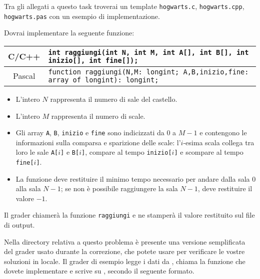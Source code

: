 \begin{warning}
Tra gli allegati a questo task troverai un template \texttt{hogwarts.c}, \texttt{hogwarts.cpp}, \texttt{hogwarts.pas} con un esempio di implementazione.
\end{warning}

Dovrai implementare la seguente funzione:

\begin{center}\begin{tabularx}{\textwidth}{|c|X|}
\hline
C/C++  & \verb|int raggiungi(int N, int M, int A[], int B[], int inizio[], int fine[]);|\\
\hline
Pascal  & \verb|function raggiungi(N,M: longint; A,B,inizio,fine: array of longint): longint;|\\
\hline
\end{tabularx}\end{center}

\begin{itemize}[nolistsep]
  \item L'intero $N$ rappresenta il numero di sale del castello.
  \item L'intero $M$ rappresenta il numero di scale.
  \item Gli array \texttt{A}, \texttt{B}, \texttt{inizio} e \texttt{fine} sono indicizzati da $0$ a $M-1$ e contengono le informazioni sulla comparsa e sparizione delle scale: l'$i$-esima scala collega tra loro le sale \texttt{A[$i$]} e \texttt{B[$i$]}, compare al tempo \texttt{inizio[$i$]} e scompare al tempo \texttt{fine[$i$]}.
  \item La funzione deve restituire il minimo tempo necessario per andare dalla sala $0$ alla sala $N-1$; se non è possibile raggiungere la sala $N-1$, deve restituire il valore $-1$.
\end{itemize}

\medskip

Il grader chiamerà la funzione \texttt{raggiungi} e ne stamperà il valore restituito sul file di output.



\Grader
Nella directory relativa a questo problema è presente una versione semplificata del grader usato durante la correzione, che potete usare per verificare le vostre soluzioni in locale. Il grader di esempio legge i dati da , chiama la funzione che dovete implementare e scrive su \outputfile{}, secondo il seguente formato.

